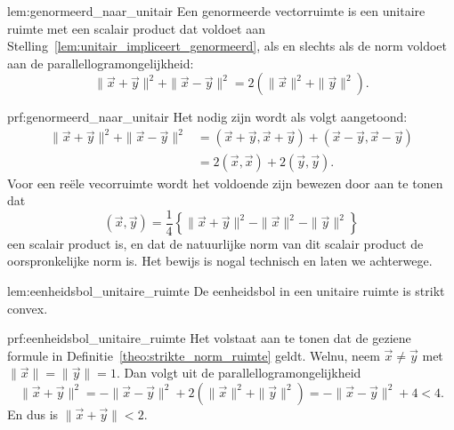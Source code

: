 \begin{lem}{lem:genormeerd_naar_unitair}
    Een genormeerde vectorruimte is een unitaire ruimte met een scalair product dat voldoet aan Stelling~\ref{lem:unitair_impliceert_genormeerd}, als en slechts als de norm voldoet aan de parallellogramongelijkheid:
    \begin{equation*}
        \| \vec{x} + \vec{y} \|^2 + \| \vec{x} - \vec{y} \|^2 = 2 \left(\| \vec{x} \|^2 + \| \vec{y} \|^2\right).
    \end{equation*}
    \vspace{-0.5cm}
\end{lem}

\begin{prf}{prf:genormeerd_naar_unitair}
    Het nodig zijn wordt als volgt aangetoond:
    \begin{align*}
        \|\vec{x} + \vec{y}\|^2 + \|\vec{x} - \vec{y}\|^2 
            &= (\vec{x} + \vec{y},\vec{x} + \vec{y}) + (\vec{x} - \vec{y},\vec{x} - \vec{y}) \\
            &= 2(\vec{x},\vec{x}) + 2(\vec{y},\vec{y}).
    \end{align*}
    Voor een reële vecorruimte wordt het voldoende zijn bewezen door aan te tonen dat
    \begin{equation*}
        (\vec{x},\vec{y}) = \frac{1}{4}\left\{
            \| \vec{x} + \vec{y} \|^2 - \| \vec{x} \|^2 - \| \vec{y} \|^2
        \right\}
    \end{equation*}
    een scalair product is, en dat de natuurlijke norm van dit scalair product de oorspronkelijke norm is. Het bewijs is nogal technisch en laten we achterwege.
\end{prf}

\begin{lem}{lem:eenheidsbol_unitaire_ruimte}
    De eenheidsbol in een unitaire ruimte is strikt convex.
\end{lem}

\newpage

\begin{prf}{prf:eenheidsbol_unitaire_ruimte}
    Het volstaat aan te tonen dat de geziene formule in Definitie~\ref{theo:strikte_norm_ruimte} geldt. Welnu, neem $\vec{x} \neq \vec{y}$ met $\|\vec{x}\| = \|\vec{y}\| = 1$. Dan volgt uit de parallellogramongelijkheid
    \begin{equation*}
        \| \vec{x} + \vec{y} \|^2 = - \| \vec{x} - \vec{y} \|^2 + 2(\| \vec{x} \|^2 + \| \vec{y}\|^2)= - \| \vec{x} - \vec{y} \|^2 + 4 < 4.
    \end{equation*}
    En dus is $\| \vec{x} + \vec{y} \| < 2$.
\end{prf}